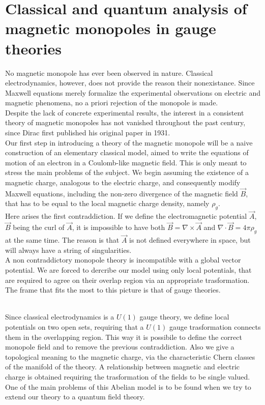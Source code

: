 

\chapter*{Classical and quantum analysis of magnetic monopoles in gauge theories}

No magnetic monopole has ever been observed in nature. Classical electrodynamics,
however, does not provide the reason their nonexistance. Since Maxwell equations
merely formalize the experimental observations on electric and magnetic phenomena,
no a priori rejection of the monopole is made.\\
Despite the lack of concrete experimental results, the interest in a consistent
theory of magnetic monopoles has not vanished throughout the past century, since
Dirac first published his original paper in 1931.\\

Our first step in introducing a theory of the magnetic monopole will be a naive
construction of an elementary classical model, aimed to write the equations of motion
of an electron in a Coulomb-like magnetic field. This is only meant to stress the
main problems of the subject.
We begin assuming the existence of a magnetic charge, analogous to the electric
charge, and consequently modify Maxwell equations, including the non-zero
divergence of the magnetic field $\vec B$, that has to be equal to the local
magnetic charge density, namely $\rho_g$.\\
Here arises the first contraddiction. If we define the electromagnetic potential
$\vec A$, $\vec B$ being the curl of $\vec A$, it is impossible to have both
$\vec B = \nabla \times \vec A$ and $\nabla \cdot \vec B = 4\pi \rho_g$ at the same
time. The reason is that $\vec A$ is not defined everywhere in space, but will
always have a string of singularities.\\

A non contraddictory monopole theory is incompatible with a global vector potential.
We are forced to dercribe our model using only local potentials, that are required
to agree on their overlap region via an appropriate trasformation.\\
The frame that fits the most to this picture is that of gauge theories.\\\

Since classical electrodynamics is a $U(1)$ gauge theory, we define local potentials
on two open sets, requiring that a $U(1)$ gauge trasformation connects them in the
overlapping region. This way it is possibile to define the correct monopole field
and to remove the previous contraddiction. Also we give a topological meaning
to the magnetic charge, via the characteristic Chern classes of the manifold of
the theory. A relationship between magnetic and electric charge is obtained
requiring the trasformation of the fields to be single valued.\\
One of the main problems of this Abelian model is to be found when we try to
extend our theory to a quantum field theory.\\

